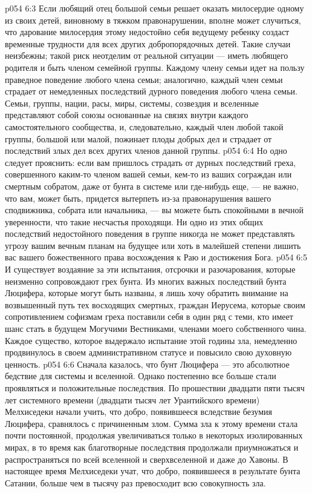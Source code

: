 \vs p054 6:3 \pc Если любящий отец большой семьи решает оказать милосердие одному из своих детей, виновному в тяжком правонарушении, вполне может случиться, что дарование милосердия этому недостойно себя ведущему ребенку создаст временные трудности для всех других добропорядочных детей. Такие случаи неизбежны; такой риск неотделим от реальной ситуации --- иметь любящего родителя и быть членом семейной группы. Каждому члену семьи идет на пользу праведное поведение любого члена семьи; аналогично, каждый член семьи страдает от немедленных последствий дурного поведения любого члена семьи. Семьи, группы, нации, расы, миры, системы, созвездия и вселенные представляют собой союзы основанные на связях внутри каждого самостоятельного сообщества, и, следовательно, каждый член любой такой группы, большой или малой, пожинает плоды добрых дел и страдает от последствий злых дел всех других членов данной группы.
\vs p054 6:4 Но одно следует прояснить: если вам пришлось страдать от дурных последствий греха, совершенного каким\hyp{}то членом вашей семьи, кем\hyp{}то из ваших сограждан или смертным собратом, даже от бунта в системе или где\hyp{}нибудь еще, --- не важно, что вам, может быть, придется вытерпеть из\hyp{}за правонарушения вашего сподвижника, собрата или начальника, --- вы можете быть спокойными в вечной уверенности, что такие несчастья проходящи. Ни одно из этих общих последствий недостойного поведения в группе никогда не может представлять угрозу вашим вечным планам на будущее или хоть в малейшей степени лишить вас вашего божественного права восхождения к Раю и достижения Бога.
\vs p054 6:5 И существует воздаяние за эти испытания, отсрочки и разочарования, которые неизменно сопровождают грех бунта. Из многих важных последствий бунта Люцифера, которые могут быть названы, я лишь хочу обратить внимание на возвышенный путь тех восходящих смертных, граждан Иерусема, которые своим сопротивлением софизмам греха поставили себя в один ряд с теми, кто имеет шанс стать в будущем Могучими Вестниками, членами моего собственного чина. Каждое существо, которое выдержало испытание этой годины зла, немедленно продвинулось в своем административном статусе и повысило свою духовную ценность.
\vs p054 6:6 \pc Сначала казалось, что бунт Люцифера --- это абсолютное бедствие для системы и вселенной. Однако постепенно все больше стали проявляться и положительные последствия. По прошествии двадцати пяти тысяч лет системного времени (двадцати тысяч лет Урантийского времени) Мелхиседеки начали учить, что добро, появившееся вследствие безумия Люцифера, сравнялось с причиненным злом. Сумма зла к этому времени стала почти постоянной, продолжая увеличиваться только в некоторых изолированных мирах, в то время как благотворные последствия продолжали приумножаться и распространяться по всей вселенной и сверхвселенной и даже до Хавоны. В настоящее время Мелхиседеки учат, что добро, появившееся в результате бунта Сатании, больше чем в тысячу раз превосходит всю совокупность зла.
